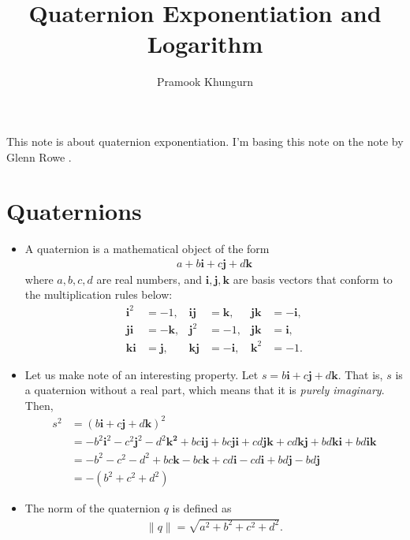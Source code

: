 \documentclass[10pt]{article}
\title{Quaternion Exponentiation and Logarithm}
\author{Pramook Khungurn}
\newcommand{\ve}[1]{\mathbf{#1}}
\begin{document}
\maketitle

This note is about quaternion exponentiation. I'm basing this note on the note by Glenn Rowe \cite{Rowe:2025}.

\section{Quaternions}

\begin{itemize}
    \item A quaternion is a mathematical object of the form
    \begin{align*}
        a + b\ve{i} + c\ve{j} + d\ve{k}
    \end{align*}
    where $a, b, c, d$ are real numbers, and $\ve{i}, \ve{j}, \ve{k}$ are basis vectors that conform to the multiplication rules below:
    \begin{align*}
        \ve{i}^2 &= -1, & \ve{i}\ve{j} &= \ve{k}, & \ve{j}\ve{k} &= -\ve{i}, \\ 
        \ve{j}\ve{i} &= -\ve{k}, & \ve{j}^2 &= -1, & \ve{j}\ve{k} &= \ve{i}, \\
        \ve{k}\ve{i} &= \ve{j}, & \ve{k}\ve{j} &= -\ve{i}, & \ve{k}^2 &= -1.
    \end{align*}

    \item Let us make note of an interesting property. Let $s = b\ve{i} + c\ve{j} + d\ve{k}$. That is, $s$ is a quaternion without a real part, which means that it is \emph{purely imaginary}. Then,
    \begin{align*}
        s^2 
        &= (b\ve{i} + c\ve{j} + d\ve{k})^2\\
        &= -b^2\ve{i}^2 -c^2\ve{j}^2 -d^2\ve{k^2} + bc\ve{i}\ve{j} + bc\ve{j}\ve{i} + cd\ve{j}\ve{k} + cd\ve{k}\ve{j} + bd\ve{k}\ve{i} + bd\ve{i}\ve{k} \\
        &= -b^2 -c^2 -d^2 + bc\ve{k} - bc\ve{k} + cd\ve{i} - cd\ve{i} + bd\ve{j} - bd\ve{j} \\
        &= -(b^2 + c^2 + d^2)
    \end{align*}

    \item The norm of the quaternion $q$ is defined as
    \begin{align*}
        \|q\| = \sqrt{a^2 + b^2 + c^2 + d^2}.
    \end{align*}


\end{itemize}
\end{document}
